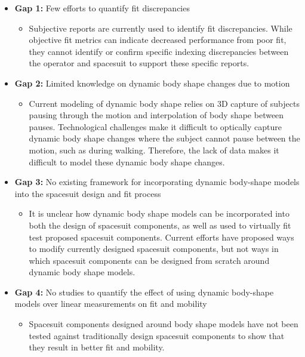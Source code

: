 \documentclass[defaultstyle,11pt]{thesis}
\providecommand{\tightlist}{%
  \setlength{\itemsep}{0pt}\setlength{\parskip}{0pt}}
\begin{document}
\begin{itemize}
\tightlist
\item
  \textbf{Gap 1:} Few efforts to quantify fit discrepancies

  \begin{itemize}
  \tightlist
  \item
    Subjective reports are currently used to identify fit discrepancies.
    While objective fit metrics can indicate decreased performance from poor fit, they cannot identify or confirm specific indexing discrepancies between the operator and spacesuit to support these specific reports.
  \end{itemize}
\item
  \textbf{Gap 2:} Limited knowledge on dynamic body shape changes due to motion

  \begin{itemize}
  \tightlist
  \item
    Current modeling of dynamic body shape relies on 3D capture of subjects pausing through the motion and interpolation of body shape between pauses.
    Technological challenges make it difficult to optically capture dynamic body shape changes where the subject cannot pause between the motion, such as during walking.
    Therefore, the lack of data makes it difficult to model these dynamic body shape changes.
  \end{itemize}
\item
  \textbf{Gap 3:} No existing framework for incorporating dynamic body-shape models into the spacesuit design and fit process

  \begin{itemize}
  \tightlist
  \item
    It is unclear how dynamic body shape models can be incorporated into both the design of spacesuit components, as well as used to virtually fit test proposed spacesuit components.
    Current efforts have proposed ways to modify currently designed spacesuit components, but not ways in which spacesuit components can be designed from scratch around dynamic body shape models.
  \end{itemize}
\item
  \textbf{Gap 4:} No studies to quantify the effect of using dynamic body-shape models over linear measurements on fit and mobility

  \begin{itemize}
  \tightlist
  \item
    Spacesuit components designed around body shape models have not been tested against traditionally design spacesuit components to show that they result in better fit and mobility.
  \end{itemize}
\end{itemize}
\end{document}
